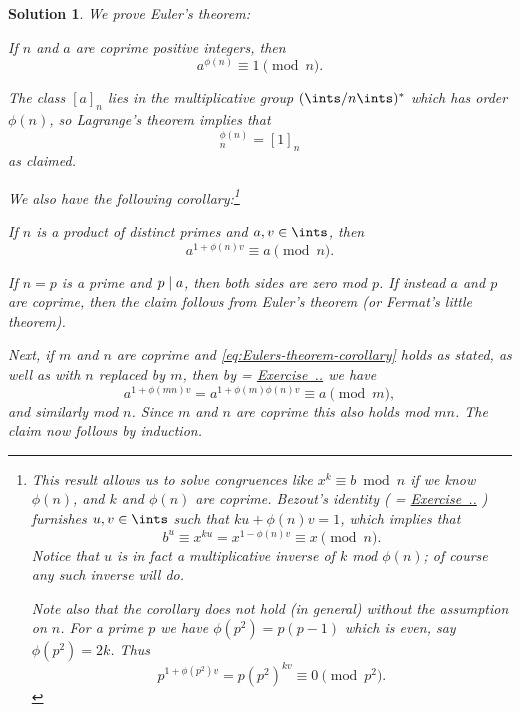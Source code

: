 \documentclass[article, a4paper, 11pt, oneside]{memoir}
\numberwithin{equation}{chapter}
\newcommand{\RNum}[1]{\uppercase\expandafter{\romannumeral #1\relax}}
\newcommand{\exref}[1]{%
    \setsepchar{.}%
    \readlist*\mylist{#1}%
    \ifnum \arabic{chapter}=\mylist[1]
        \def\mylabel{\mylist[2].\mylist[3]}%
    \else
        \def\mylabel{\RNum{\mylist[1]}.\mylist[2].\mylist[3]}%
    \fi
    \hyperref[ex:#1]{Exercise~\mylabel}%
}
\theoremstyle{nonumberplain}
\newtheorem{solution}{Solution}
\newenvironment{displaytheorem}{%
	\begin{displayquote}\itshape%
}{%
	\end{displayquote}%
}
\begin{document}
\begin{solution}
    We prove \emph{Euler's theorem}:
    \begin{displaytheorem}
        If $n$ and $a$ are coprime positive integers, then
        \begin{equation*}
            a^{\phi(n)} \equiv 1 \pmod n.
        \end{equation*}
    \end{displaytheorem}
    The class $[a]_n$ lies in the multiplicative group $(\ints/n\ints)^*$ which has order $\phi(n)$, so Lagrange's theorem implies that
    \begin{equation*}
        [a]_n^{\phi(n)}
            = [1]_n
    \end{equation*}
    as claimed.

    We also have the following corollary:\footnote{This result allows us to solve congruences like $x^k \equiv b \bmod n$ if we know $\phi(n)$, and $k$ and $\phi(n)$ are coprime. Bezout's identity (\exref{2.2.13}) furnishes $u,v \in \ints$ such that $ku + \phi(n)v = 1$, which implies that
    \begin{equation*}
        b^u
            \equiv x^{ku}
            = x^{1 - \phi(n)v}
            \equiv x \pmod n.
    \end{equation*}
    Notice that $u$ is in fact a multiplicative inverse of $k$ mod $\phi(n)$; of course any such inverse will do.
    
    Note also that the corollary does not hold (in general) without the assumption on $n$. For a prime $p$ we have $\phi(p^2) = p(p-1)$ which is even, say $\phi(p^2) = 2k$. Thus
    \begin{equation*}
        p^{1 + \phi(p^2) v}
            = p (p^2)^{kv}
            \equiv 0 \pmod {p^2}.
    \end{equation*}}
    \begin{displaytheorem}
        If $n$ is a product of distinct primes and $a,v \in \ints$, then
        \begin{equation}
            \label{eq:Eulers-theorem-corollary}
            a^{1+\phi(n)v} \equiv a \pmod n.
        \end{equation}
    \end{displaytheorem}
    If $n = p$ is a prime and $p \mid a$, then both sides are zero mod $p$. If instead $a$ and $p$ are coprime, then the claim follows from Euler's theorem (or Fermat's little theorem).

    Next, if $m$ and $n$ are coprime and \cref{eq:Eulers-theorem-corollary} holds as stated, as well as with $n$ replaced by $m$, then by \exref{5.6.8} we have
    \begin{equation*}
        a^{1+\phi(mn)v}
            = a^{1+\phi(m)\phi(n)v}
            \equiv a \pmod m,
    \end{equation*}
    and similarly mod $n$. Since $m$ and $n$ are coprime this also holds mod $mn$. The claim now follows by induction.
\end{solution}
\end{document}
